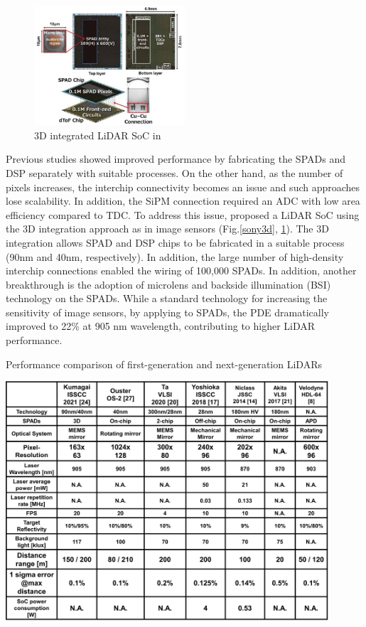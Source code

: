 \documentclass[paper]{ieice}
\begin{document}
\begin{figure}[!t]
\centering
 \includegraphics[width=0.5\textwidth]{figs/sony}
  \caption{3D integrated LiDAR SoC in \cite{kumagai2021189x600}}
\label{sony}
\end{figure}

\qquad Previous studies showed improved performance by fabricating the SPADs and DSP separately with suitable processes. On the other hand, as the number of pixels increases, the interchip connectivity becomes an issue and such approaches lose scalability. In addition, the SiPM connection required an ADC with low area efficiency compared to TDC. To address this issue, \cite{kumagai2021189x600, ito2020back} proposed a LiDAR SoC using the 3D integration approach as in image sensors (Fig.\ref{sony3d}, \ref{sony}). 
The 3D integration allows SPAD and DSP chips to be fabricated in a suitable process (90nm and 40nm, respectively). In addition, the large number of high-density interchip connections enabled the wiring of 100,000 SPADs.
In addition, another breakthrough is the adoption of microlens and backside illumination (BSI) technology on the SPADs. While a standard technology for increasing the sensitivity of image sensors, by applying to SPADs, the PDE dramatically improved to 22\% at 905 nm wavelength, contributing to higher LiDAR performance.

\begin{table}[!t]
\centering
\caption{Performance comparison of first-generation and next-generation LiDARs}
 \includegraphics[width=0.9\textwidth]{figs/performance.png}
\label{perf}
\end{table}
\end{document}
